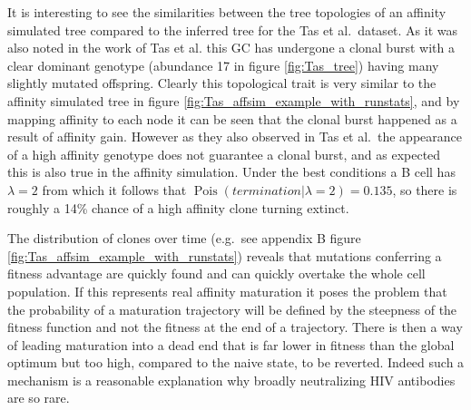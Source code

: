 It is interesting to see the similarities between the tree topologies of an affinity simulated tree compared to the inferred tree for the Tas et al.\ dataset.
As it was also noted in the work of Tas et al. \cite{tas2016visualizing} this GC has undergone a clonal burst with a clear dominant genotype (abundance 17 in figure \ref{fig:Tas_tree}) having many slightly mutated offspring.
Clearly this topological trait is very similar to the affinity simulated tree in figure \ref{fig:Tas_affsim_example_with_runstats}, and by mapping affinity to each node it can be seen that the clonal burst happened as a result of affinity gain.
However as they also observed in Tas et al.\ the appearance of a high affinity genotype does not guarantee a clonal burst, and as expected this is also true in the affinity simulation.
Under the best conditions a B cell has $\lambda=2$ from which it follows that $\operatorname{Pois}(termination | \lambda=2) = 0.135$, so there is roughly a 14\% chance of a high affinity clone turning extinct.




The distribution of clones over time (e.g.\ see appendix B figure \ref{fig:Tas_affsim_example_with_runstats}) reveals that mutations conferring a fitness advantage are quickly found and can quickly overtake the whole cell population.
If this represents real affinity maturation it poses the problem that the probability of a maturation trajectory will be defined by the steepness of the fitness function and not the fitness at the end of a trajectory.
There is then a way of leading maturation into a dead end that is far lower in fitness than the global optimum but too high, compared to the naive state, to be reverted.
Indeed such a mechanism is a reasonable explanation why broadly neutralizing HIV antibodies are so rare.


